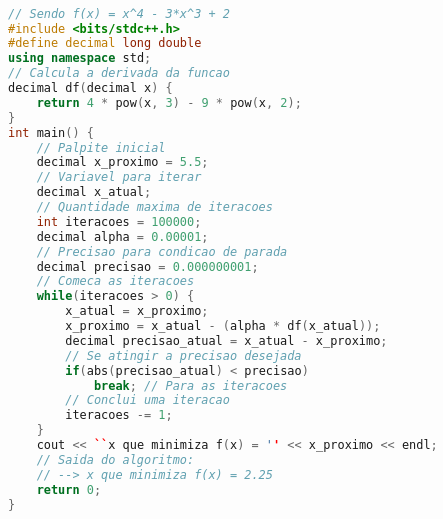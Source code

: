 \begin{lstlisting}[language=C++]

// Sendo f(x) = x^4 - 3*x^3 + 2
#include <bits/stdc++.h>
#define decimal long double
using namespace std;
// Calcula a derivada da funcao
decimal df(decimal x) {
	return 4 * pow(x, 3) - 9 * pow(x, 2);
}
int main() {
	// Palpite inicial
	decimal x_proximo = 5.5;
	// Variavel para iterar
	decimal x_atual;
	// Quantidade maxima de iteracoes
	int iteracoes = 100000;
	decimal alpha = 0.00001;
	// Precisao para condicao de parada
	decimal precisao = 0.000000001;
	// Comeca as iteracoes
	while(iteracoes > 0) {
		x_atual = x_proximo;
		x_proximo = x_atual - (alpha * df(x_atual));
		decimal precisao_atual = x_atual - x_proximo;
		// Se atingir a precisao desejada
		if(abs(precisao_atual) < precisao)
			break; // Para as iteracoes
		// Conclui uma iteracao
		iteracoes -= 1;
	}
	cout << ``x que minimiza f(x) = '' << x_proximo << endl;
	// Saida do algoritmo:
	// --> x que minimiza f(x) = 2.25
	return 0;
}


\end{lstlisting}
